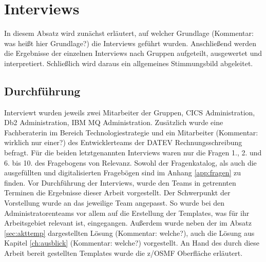 \section{Interviews}
In diesem Absatz wird zunächst erläutert, auf welcher Grundlage (Kommentar: was heißt hier Grundlage?) die Interviews geführt wurden.
Anschließend werden die Ergebnisse der einzelnen Interviews nach Gruppen aufgeteilt, ausgewertet und interpretiert.
Schließlich wird daraus ein allgemeines Stimmungsbild abgeleitet.

\subsection{Durchführung}
Interviewt wurden jeweils zwei Mitarbeiter der Gruppen, CICS Administration, Db2 Administration, IBM MQ Administration.
Zusätzlich wurde eine Fachberaterin im Bereich Technologiestrategie und ein Mitarbeiter (Kommentar: wirklich nur einer?) des Entwicklerteams der DATEV Rechnungsschreibung befragt.
Für die beiden letztgenannten Interviews waren nur die Fragen 1., 2. und 6. bis 10. des Fragebogens von Relevanz.
Sowohl der Fragenkatalog, als auch die ausgefüllten und digitalisierten Fragebögen sind im Anhang \ref{app:fragen} zu finden.
Vor Durchführung der Interviews, wurde den Teams in getrennten Terminen die Ergebnisse dieser Arbeit vorgestellt.
Der Schwerpunkt der Vorstellung wurde an das jeweilige Team angepasst.
So wurde bei den Administratorenteams vor allem auf die Erstellung der Templates, was für ihr Arbeitsgebiet relevant ist, eingegangen.
Außerdem wurde neben der im Absatz \ref{sec:akttemp} dargestellten Lösung (Kommentar: welche?), auch die Lösung aus Kapitel \ref{ch:ausblick} (Kommentar: welche?) vorgestellt.
An Hand des durch diese Arbeit bereit gestellten Templates wurde die z/OSMF Oberfläche erläutert.

